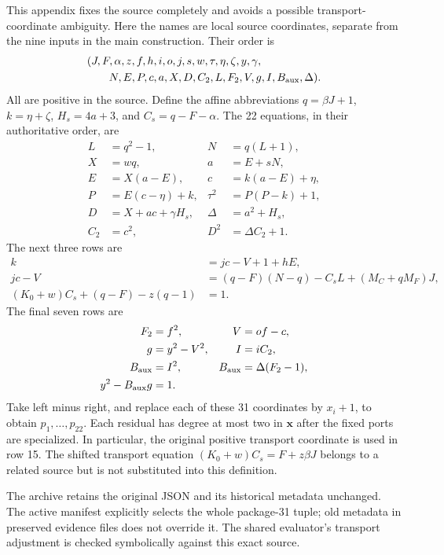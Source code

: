\documentclass[11pt]{article}
\theoremstyle{remark}\newtheorem{remark}[theorem]{Remark}
\begin{document}
This appendix fixes the source completely and avoids a possible
transport-coordinate ambiguity. Here the names are local source
coordinates, separate from the nine inputs in the main construction.
Their order is
\begin{align*}
 &(J,F,\alpha,z,f,h,i,o,j,s,w,\tau,\eta,\zeta,y,\gamma,\\
 &\hspace{2em}N,E,P,c,a,X,D,C_2,L,F_2,V,g,I,B_{\rm aux},\Delta).
\end{align*}
All are positive in the source. Define the affine abbreviations
$q=\beta J+1$, $k=\eta+\zeta$, $H_s=4a+3$, and $C_s=q-F-\alpha$.
The 22 equations, in their authoritative order, are
\begin{align*}
 L&=q^2-1,&N&=q(L+1),\\
 X&=wq,&a&=E+sN,\\
 E&=X(a-E),&c&=k(a-E)+\eta,\\
 P&=E(c-\eta)+k,&\tau^2&=P(P-k)+1,\\
 D&=X+ac+\gamma H_s,&\Delta&=a^2+H_s,\\
 C_2&=c^2,&D^2&=\Delta C_2+1.
\end{align*}
The next three rows are
\begin{align*}
 k&=jc-V+1+hE,\\
 jc-V&=(q-F)(N-q)-C_sL+(M_C+qM_F)J,\\
 (K_0+w)C_s+(q-F)-z(q-1)&=1.
\end{align*}
The final seven rows are
\begin{align*}
 F_2&=f^2,&V&=of-c,\\
 g&=y^2-V^2,&I&=iC_2,\\
 B_{\rm aux}&=I^2,&B_{\rm aux}&=\Delta(F_2-1),\\
 y^2-B_{\rm aux}g&=1.
\end{align*}
Take left minus right, and replace each of these 31 coordinates by
$x_i+1$, to obtain $p_1,\ldots,p_{22}$. Each residual has degree at most
two in $\mathbf x$ after the fixed ports are specialized. In particular,
the original positive transport coordinate is used in row 15. The
shifted transport equation $(K_0+w)C_s=F+z\beta J$ belongs to a related
source but is not substituted into this definition.

The archive retains the original JSON and its historical metadata
unchanged. The active manifest explicitly selects the whole package-31
tuple; old metadata in preserved evidence files does not override it.
The shared evaluator's transport adjustment is checked symbolically
against this exact source.
\end{document}

